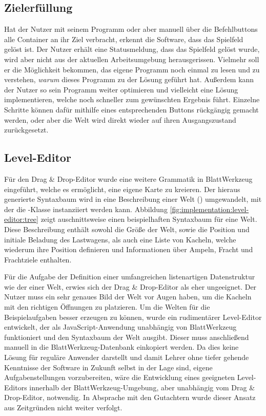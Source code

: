\subsection{Zielerfüllung}
\label{sec:implementation:finish}

Hat der Nutzer mit seinem Programm oder aber manuell über die Befehlbuttons alle Container an ihr Ziel verbracht, erkennt die Software, dass das Spielfeld gelöst ist. Der Nutzer erhält eine Statusmeldung, dass das Spielfeld gelöst wurde, wird aber nicht aus der aktuellen Arbeitsumgebung herausgerissen. Vielmehr soll er die Möglichkeit bekommen, das eigene Programm noch einmal zu lesen und zu verstehen, \emph{warum} dieses Programm zu der Lösung geführt hat. Außerdem kann der Nutzer so sein Programm weiter optimieren und vielleicht eine Lösung implementieren, welche noch schneller zum gewünschten Ergebnis führt. Einzelne Schritte können dafür mithilfe eines entsprechenden Buttons rückgängig gemacht werden, oder aber die Welt wird direkt wieder auf ihren Ausgangszustand zurückgesetzt.

\subsection{Level-Editor}
\label{sec:implementation:level-editor}

Für den Drag \& Drop-Editor wurde eine weitere Grammatik in BlattWerkzeug eingeführt, welche es ermöglicht, eine eigene Karte zu kreieren. Der hieraus generierte Syntaxbaum wird in eine Beschreibung einer Welt () umgewandelt, mit der die -Klasse instanziiert werden kann. Abbildung \ref{fig:implementation:level-editor:tree} zeigt auschnittsweise einen beispielhaften Syntaxbaum für eine Welt. Diese Beschreibung enthält sowohl die Größe der Welt, sowie die Position und initiale Beladung des Lastwagens, als auch eine Liste von Kacheln, welche wiederum ihre Position definieren und Informationen über Ampeln, Fracht und Frachtziele enthalten.

Für die Aufgabe der Definition einer umfangreichen listenartigen Datenstruktur wie der einer Welt, erwies sich der Drag \& Drop-Editor als eher ungeeignet. Der Nutzer muss ein sehr genaues Bild der Welt vor Augen haben, um die Kacheln mit den richtigen Öffnungen zu platzieren. Um die Welten für die Beispielaufgaben besser erzeugen zu können, wurde ein rudimentärer Level-Editor entwickelt, der als JavaScript-Anwendung unabhängig von BlattWerkzeug funktioniert und den Syntaxbaum der Welt ausgibt. Dieser muss anschließend manuell in die BlattWerkzeug-Datenbank einkopiert werden. Da dies keine Lösung für reguläre Anwender darstellt und damit Lehrer ohne tiefer gehende Kenntnisse der Software in Zukunft selbst in der Lage sind, eigene Aufgabenstellungen vorzubereiten, wäre die Entwicklung eines geeigneten Level-Editors innerhalb der BlattWerkzeug-Umgebung, aber unabhängig vom Drag \& Drop-Editor, notwendig. In Absprache mit den Gutachtern wurde dieser Ansatz aus Zeitgründen nicht weiter verfolgt.

